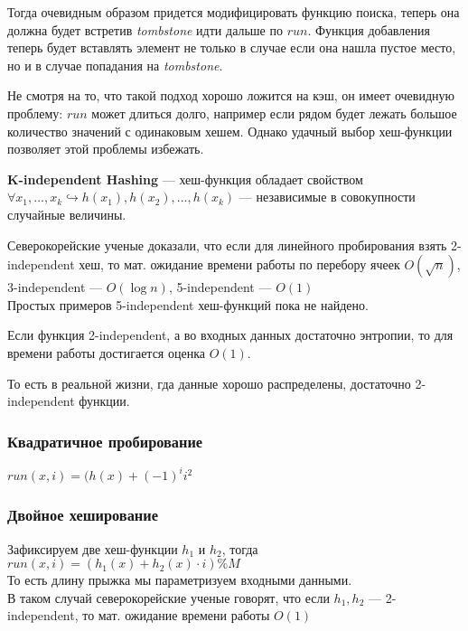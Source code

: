 Тогда очевидным образом придется модифицировать функцию поиска, теперь она должна будет встретив  \textit{tombstone} идти дальше по $run$. 
Функция добавления теперь будет вставлять элемент не только в случае если она нашла пустое место, но и в случае попадания на \textit{tombstone}. 


Не смотря на то, что такой подход хорошо ложится на кэш, он имеет очевидную проблему: $run$ может длиться долго, 
например если рядом будет лежать большое количество значений с одинаковым хешем. Однако удачный выбор хеш-функции позволяет этой проблемы избежать.

\begin{Def}
    \textbf{K-independent Hashing} --- хеш-функция обладает свойством $\forall x_1, ..., x_k \hookrightarrow h(x_1), h(x_2), ..., h(x_k)$ --- независимые в совокупности случайные величины.
\end{Def}

Северокорейские ученые доказали, что если для линейного пробирования взять 2-independent хеш, 
то мат. ожидание времени работы по перебору ячеек $O(\sqrt{n})$, 3-independent ---  $O(\log{n})$, 5-independent ---  $O(1)$ \\
Простых примеров 5-independent хеш-функций пока не найдено.

\begin{theorem}
    Если функция 2-independent, а во входных данных достаточно энтропии, то для времени работы достигается оценка $O(1)$. 
\end{theorem}

То есть в реальной жизни, гда данные хорошо распределены, достаточно 2-independent функции. 

\subsubsection{Квадратичное пробирование}
$run(x, i) = (h(x) + (-1)^i i^2$ 

\subsubsection{Двойное хеширование}
Зафиксируем две хеш-функции $h_1$ и  $h_2$, тогда  $run(x, i) = (h_1(x) + h_2(x) \cdot i) \% M$ \\
То есть длину прыжка мы параметризуем входными данными. \\
В таком случай северокорейские ученые говорят, что если $h_1, h_2$ --- 2-independent, то мат. ожидание времени работы  $O(1)$

